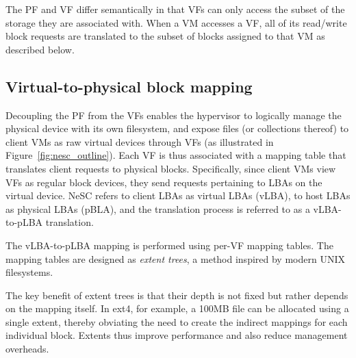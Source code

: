 The PF and VF differ semantically in that VFs can only access the subset of the storage they are associated with. When a VM accesses a VF, all of its read/write block requests are translated to the subset of blocks assigned to that VM as described below.

\subsection{Virtual-to-physical block mapping}

Decoupling the PF from the VFs enables the hypervisor to logically manage the physical device with its own filesystem, and expose files (or collections thereof) to client VMs as raw virtual devices through VFs (as illustrated in Figure~\ref{fig:nesc_outline}). Each VF is thus associated with a mapping table that translates client requests to physical blocks. Specifically, since client VMs view VFs as regular block devices, they send requests pertaining to LBAs on the virtual device. NeSC refers to client LBAs as virtual LBAs (vLBA), to host LBAs as physical LBAs (pBLA), and the translation process is referred to as a vLBA-to-pLBA translation.

The vLBA-to-pLBA mapping is performed using per-VF mapping tables. The mapping tables are designed as \emph{extent trees}, a method inspired by modern UNIX filesystems.
%

The key benefit of extent trees is that their depth is not fixed but rather depends on the mapping itself. In ext4, for example, a 100MB file can be allocated using a single extent, thereby obviating the need to create the indirect mappings for each individual block. Extents thus improve performance and also reduce management overheads.

